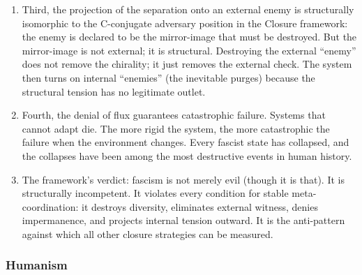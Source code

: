 \documentclass[
]{article}
\begin{document}
\begin{enumerate}
  its own axioms complete.
\item
  Third, the projection of the separation onto an external enemy is
  structurally isomorphic to the C-conjugate adversary position in the
  Closure framework: the enemy is declared to be the mirror-image that
  must be destroyed. But the mirror-image is not external; it is
  structural. Destroying the external ``enemy'' does not remove the
  chirality; it just removes the external check. The system then turns
  on internal ``enemies'' (the inevitable purges) because the structural
  tension has no legitimate outlet.
\item
  Fourth, the denial of flux guarantees catastrophic failure. Systems
  that cannot adapt die. The more rigid the system, the more
  catastrophic the failure when the environment changes. Every fascist
  state has collapsed, and the collapses have been among the most
  destructive events in human history.
\item
  The framework's verdict: fascism is not merely evil (though it is
  that). It is structurally incompetent. It violates every condition for
  stable meta-coordination: it destroys diversity, eliminates external
  witness, denies impermanence, and projects internal tension outward.
  It is the anti-pattern against which all other closure strategies can
  be measured.
\end{enumerate}

\subsubsection{Humanism}\label{humanism}
\end{document}
